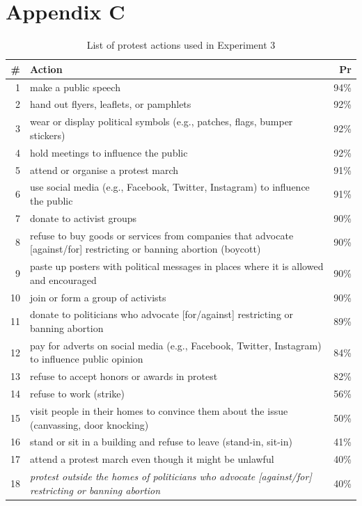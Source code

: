 \documentclass[twocolumn, 11pt, letterpaper]{article}
\begin{document}
\begin{table}

\section{Appendix C}

\caption{List of protest actions used in Experiment 3}
\small
\begin{tabularx}{\linewidth}{rXr}
\addlinespace
\toprule
\# & Action & Pr\\
\midrule
1 & make a public speech & 94\%\\
2 & hand out flyers, leaflets, or pamphlets & 92\%\\
3 & wear or display political symbols (e.g., patches, flags, bumper stickers) & 92\%\\
4 & hold meetings to influence the public & 92\%\\
5 & attend or organise a protest march & 91\%\\
6 & use social media (e.g., Facebook, Twitter, Instagram) to influence the public & 91\%\\
7 & donate to activist groups & 90\%\\
8 & refuse to buy goods or services from companies that advocate [against/for] restricting or banning abortion (boycott) & 90\%\\
9 & paste up posters with political messages in places where it is allowed and encouraged & 90\%\\
10 & join or form a group of activists & 90\%\\
11 & donate to politicians who advocate [for/against] restricting or banning abortion & 89\%\\
12 & pay for adverts on social media (e.g., Facebook, Twitter, Instagram) to influence public opinion & 84\%\\
13 & refuse to accept honors or awards in protest & 82\%\\
14 & refuse to work (strike) & 56\%\\
15 & visit people in their homes to convince them about the issue (canvassing, door knocking) & 50\%\\
16 & stand or sit in a building and refuse to leave (stand-in, sit-in) & 41\%\\
17 & attend a protest march even though it might be unlawful & 40\%\\
18 & \textit{protest outside the homes of politicians who advocate [against/for] restricting or banning abortion} & 40\%\\

\end{tabularx}
\end{table}
\end{document}
